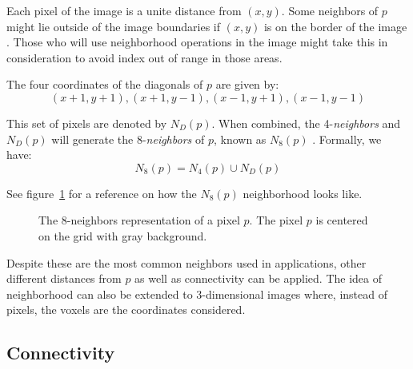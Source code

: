 Each pixel of the image is a unite distance from $(x, y)$. Some neighbors of $p$ might lie outside of the image boundaries if $(x, y)$ is on the border of the image \citep{gonzalez:02}. Those who will use neighborhood operations in the image might take this in consideration to avoid index out of range in those areas.

The four coordinates of the diagonals of $p$ are given by:
\begin{equation*}
    (x + 1, y + 1), (x + 1, y - 1), (x - 1, y + 1), (x - 1, y - 1)
    \label{eq:nd_neighbors}
\end{equation*}

This set of pixels are denoted by $N_D(p)$. When combined, the 4-\textit{neighbors} and $N_D(p)$ will generate the 8-\textit{neighbors} of $p$, known as $N_8(p)$ \citep{gonzalez:02}. Formally, we have:
\begin{equation*}
    N_8(p) = N_4(p) \cup N_D(p)
    \label{eq:n8_neighbors}
\end{equation*}

See figure~\ref{fig:n8-neighbors} for a reference on how the $N_8(p)$ neighborhood looks like.

\begin{figure}[ht]
    \centering

    \caption[The 8-neighbors representation of a pixel $p$]{The 8-neighbors representation of a pixel $p$. The pixel $p$ is centered on the grid with gray background.}
    \label{fig:n8-neighbors}
\end{figure}

Despite these are the most common neighbors used in applications, other different distances from $p$ as well as connectivity can be applied. The idea of neighborhood can also be extended to 3-dimensional images where, instead of pixels, the voxels are the coordinates considered.


\subsection{Connectivity}
\label{sec:connectivity}

